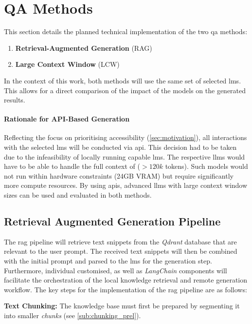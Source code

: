 \section{QA Methods}\label{sec:method_implementation}

This section details the planned technical implementation of the two \ac{qa} methods:
%
\begin{enumerate}
    \item \textbf{Retrieval-Augmented Generation} (RAG)
    \item \textbf{Large Context Window} (LCW)
\end{enumerate}
%
In the context of this work, both methods will use the same set of selected \acp{lm}.
This allows for a direct comparison of the impact of the models on the generated results.
%
\paragraph{Rationale for API-Based Generation}\label{par:api_generation_rationale}

Reflecting the focus on prioritising accessibility (\cref{sec:motivation}), all interactions with the selected \acp{lm} will be conducted via \ac{api}.
This decision had to be taken due to the infeasibility of locally running capable \acp{lm}.
The respective \acp{llm} would have to be able to handle the full context of \citet{bb2} ($> 120k$ tokens).
Such models would not run within hardware constraints (24GB VRAM) but require significantly more compute resources.
By using \acp{api}, advanced \acp{llm} with large context window sizes can be used and evaluated in both methods.
%
\subsection[RAG Pipeline]{Retrieval Augmented Generation Pipeline}\label{subsec:rag_pipeline}
    The \ac{rag} pipeline will retrieve text snippets from the \textit{Qdrant} database that are relevant to the user prompt.
    The received text snippets will then be combined with the initial prompt and parsed to the \acp{lm} for the generation step.
    Furthermore, individual customised, as well as \textit{LangChain} components will facilitate the orchestration of the local knowledge retrieval and remote generation workflow.
    The key steps for the implementation of the \ac{rag} pipeline are as follows:

\noindent\textbf{Text Chunking:}\label{par:chunking_approach}\newline
    The knowledge base \citet{bb2} must first be prepared by segmenting it into smaller \textit{chunks} (see \cref{sub:chunking_prel}).
